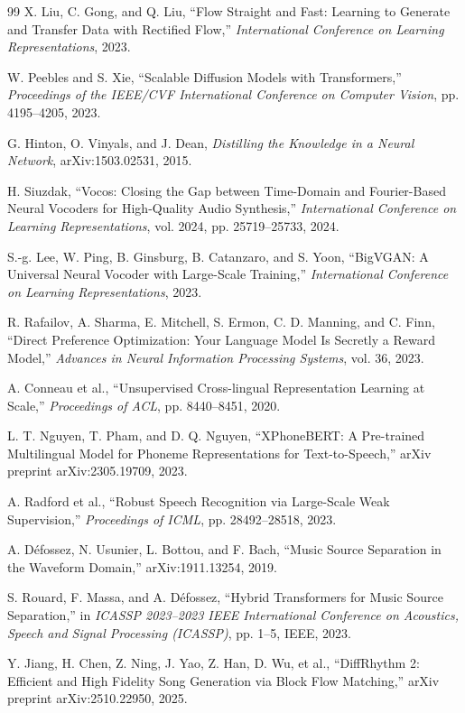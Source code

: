 \documentclass[a4paper,13pt,oneside]{report}
\begin{document}
\begin{thebibliography}{99}
X. Liu, C. Gong, and Q. Liu,
``Flow Straight and Fast: Learning to Generate and Transfer Data with Rectified
Flow,''
\textit{International Conference on Learning Representations}, 2023.

W. Peebles and S. Xie,
``Scalable Diffusion Models with Transformers,''
\textit{Proceedings of the IEEE/CVF International Conference on Computer Vision},
pp. 4195--4205, 2023.

G. Hinton, O. Vinyals, and J. Dean,
\textit{Distilling the Knowledge in a Neural Network},
arXiv:1503.02531, 2015.

H. Siuzdak,
``Vocos: Closing the Gap between Time-Domain and Fourier-Based Neural Vocoders
for High-Quality Audio Synthesis,''
\textit{International Conference on Learning Representations}, vol. 2024,
pp. 25719--25733, 2024.

S.-g. Lee, W. Ping, B. Ginsburg, B. Catanzaro, and S. Yoon,
``BigVGAN: A Universal Neural Vocoder with Large-Scale Training,''
\textit{International Conference on Learning Representations}, 2023.

R. Rafailov, A. Sharma, E. Mitchell, S. Ermon, C. D. Manning, and C. Finn,
``Direct Preference Optimization: Your Language Model Is Secretly a Reward
Model,''
\textit{Advances in Neural Information Processing Systems}, vol. 36, 2023.

A. Conneau et al.,
``Unsupervised Cross-lingual Representation Learning at Scale,''
\textit{Proceedings of ACL}, pp. 8440--8451, 2020.

L. T. Nguyen, T. Pham, and D. Q. Nguyen,
``XPhoneBERT: A Pre-trained Multilingual Model for Phoneme Representations for
Text-to-Speech,''
arXiv preprint arXiv:2305.19709, 2023.

A. Radford et al.,
``Robust Speech Recognition via Large-Scale Weak Supervision,''
\textit{Proceedings of ICML}, pp. 28492--28518, 2023.

A. D\'efossez, N. Usunier, L. Bottou, and F. Bach,
``Music Source Separation in the Waveform Domain,''
arXiv:1911.13254, 2019.

S. Rouard, F. Massa, and A. D\'efossez,
``Hybrid Transformers for Music Source Separation,''
in \textit{ICASSP 2023--2023 IEEE International Conference on Acoustics, Speech
and Signal Processing (ICASSP)}, pp. 1--5, IEEE, 2023.


Y. Jiang, H. Chen, Z. Ning, J. Yao, Z. Han, D. Wu, et al.,
``DiffRhythm 2: Efficient and High Fidelity Song Generation via Block Flow
Matching,''
arXiv preprint arXiv:2510.22950, 2025.


\end{thebibliography}
\end{document}
